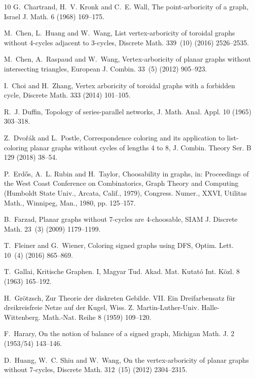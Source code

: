 \documentclass{article}
\theoremstyle{definition}
\begin{document}
\begin{thebibliography}{10}
G.~Chartrand, H.~V. Kronk and C.~E. Wall, The point-arboricity of a graph,
  Israel J. Math. 6 (1968) 169--175.

M.~Chen, L.~Huang and W.~Wang, List vertex-arboricity of toroidal graphs
  without 4-cycles adjacent to 3-cycles, Discrete Math. 339~(10) (2016)
  2526--2535.

M.~Chen, A.~Raspaud and W.~Wang, Vertex-arboricity of planar graphs without
  intersecting triangles, European J. Combin. 33~(5) (2012) 905--923.

I.~Choi and H.~Zhang, Vertex arboricity of toroidal graphs with a forbidden
  cycle, Discrete Math. 333 (2014) 101--105.

R.~J. Duffin, Topology of series-parallel networks, J. Math. Anal. Appl. 10
  (1965) 303--318.

Z.~Dvo\v{r}\'{a}k and L.~Postle, Correspondence coloring and its application to
  list-coloring planar graphs without cycles of lengths 4 to 8, J. Combin.
  Theory Ser. B 129 (2018) 38--54.

P.~Erd\H{o}s, A.~L. Rubin and H.~Taylor, Choosability in graphs, in:
  Proceedings of the {W}est {C}oast {C}onference on {C}ombinatorics, {G}raph
  {T}heory and {C}omputing ({H}umboldt {S}tate {U}niv., {A}rcata, {C}alif.,
  1979), Congress. Numer., XXVI, Utilitas Math., Winnipeg, Man., 1980, pp.
  125--157.

B.~Farzad, Planar graphs without 7-cycles are 4-choosable, SIAM J. Discrete
  Math. 23~(3) (2009) 1179--1199.

T.~Fleiner and G.~Wiener, Coloring signed graphs using {DFS}, Optim. Lett.
  10~(4) (2016) 865--869.

T.~Gallai, Kritische {G}raphen. {I}, Magyar Tud. Akad. Mat. Kutat\'{o} Int.
  K\"{o}zl. 8 (1963) 165--192.

H.~Gr\"otzsch, Zur {T}heorie der diskreten {G}ebilde. {VII}. {E}in
  {D}reifarbensatz f\"ur dreikreisfreie {N}etze auf der {K}ugel, Wiss. Z.
  Martin-Luther-Univ. Halle-Wittenberg. Math.-Nat. Reihe 8 (1959) 109--120.

F.~Harary, On the notion of balance of a signed graph, Michigan Math. J. 2
  (1953/54) 143--146.

D.~Huang, W.~C. Shiu and W.~Wang, On the vertex-arboricity of planar graphs
  without 7-cycles, Discrete Math. 312~(15) (2012) 2304--2315.


\end{thebibliography}
\end{document}
